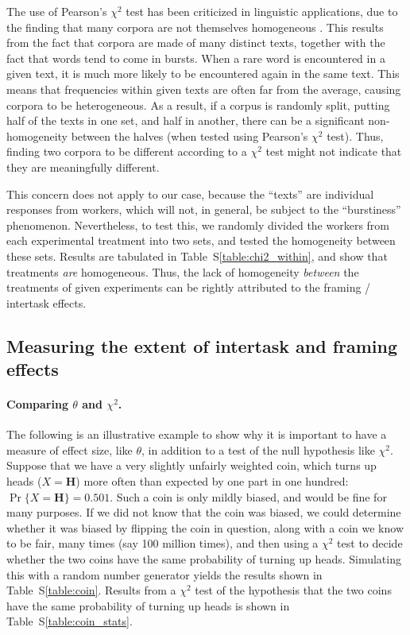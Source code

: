 \documentclass[12pt]{article}
\begin{document}
The use of Pearson's $\chi^2$ test has been criticized in linguistic 
applications, due to the finding that many corpora are not themselves
homogeneous \cite{kilgarriff1996comparing}.  
This results from the fact that corpora are made of many
distinct texts, together with the fact that words tend to come in bursts.
When a rare word is encountered in a given text, it is much more likely
to be encountered again in the same text. This means that
frequencies within given texts are often far from the average, causing 
corpora to be heterogeneous.
As a result, if a corpus is randomly split, putting half of the texts in one 
set, and half in another, there can be a significant non-homogeneity between 
the halves (when tested using Pearson's $\chi^2$ test).  Thus, finding two
corpora to be different according to a $\chi^2$ test might not 
indicate that they are meaningfully different.

This concern does not apply to our case, because the ``texts'' are 
individual responses from workers, which will not, in general, be subject to 
the ``burstiness'' phenomenon.  Nevertheless, to test this, we randomly 
divided the workers from each experimental treatment into two sets, and 
tested the homogeneity 
between these sets.  Results are tabulated in Table~S\ref{table:chi2_within}, 
and show that treatments 
\textit{are} homogeneous.  Thus, the lack of homogeneity \textit{between} 
the treatments of given experiments can be rightly attributed to the 
framing / intertask effects.

\subsection*{Measuring the extent of intertask and framing effects}

\paragraph{Comparing $\theta$ and $\chi^2$.}
The following is an illustrative example to show why it is important to 
have a measure of effect size, like $\theta$, in addition to a test of the 
null hypothesis like $\chi^2$.
Suppose that we have a very slightly unfairly weighted coin, which turns
up heads ($X=\mathbf{H}$) more often than expected by one part in one hundred:
$\Pr\{X=\mathbf{H}\} = 0.501$. Such a coin is only mildly biased, and would 
be fine for many purposes.  If we did not know that the coin was
biased, we could determine whether it was biased by flipping the coin in 
question, along with a coin we know to be fair, many times 
(say 100 million times), and then using a $\chi^2$ test to decide whether 
the two coins have the same probability of turning up heads.
Simulating this with a random number generator yields the results shown
in Table~S\ref{table:coin}.  Results from a $\chi^2$ test of the
hypothesis that the two coins have the same probability of turning up heads 
is shown in Table~S\ref{table:coin_stats}.
\end{document}
